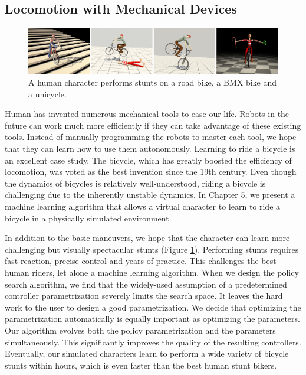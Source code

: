 \subsection{Locomotion with Mechanical Devices}

\begin{figure}[!h]
  \centering
    \includegraphics[width=\textwidth]{figures/teaserBicycle.eps}
  \caption{A human character performs stunts on a road bike, a BMX bike and a unicycle.}
  \label{fig:teaser3}
\end{figure}

Human has invented numerous mechanical tools to ease our life. Robots in the future can work much more efficiently if they can take advantage of these existing tools. Instead of manually programming the robots to master each tool, we hope that they can learn how to use them autonomously. Learning to ride a bicycle is an excellent case study. The bicycle, which has greatly boosted the efficiency of locomotion, was voted as the best invention since the 19th century. Even though the dynamics of bicycles is relatively well-understood, riding a bicycle is challenging due to the inherently unstable dynamics. In Chapter 5, we present a machine learning algorithm \cite{Tan:2014} that allows a virtual character to learn to ride a bicycle in a physically simulated environment. 

In addition to the basic maneuvers, we hope that the character can learn more challenging but visually spectacular stunts (Figure \ref{fig:teaser3}). Performing stunts requires fast reaction, precise control and years of practice. This challenges the best human riders, let alone a machine learning algorithm. When we design the policy search algorithm, we find that the widely-used assumption of a predetermined controller parametrization severely limits the search space. It leaves the hard work to the user to design a good parametrization. We decide that optimizing the parametrization automatically is equally important as optimizing the parameters. Our algorithm evolves both the policy parametrization and the parameters simultaneously. This significantly improves the quality of the resulting controllers. Eventually, our simulated characters learn to perform a wide variety of bicycle stunts within hours, which is even faster than the best human stunt bikers.

